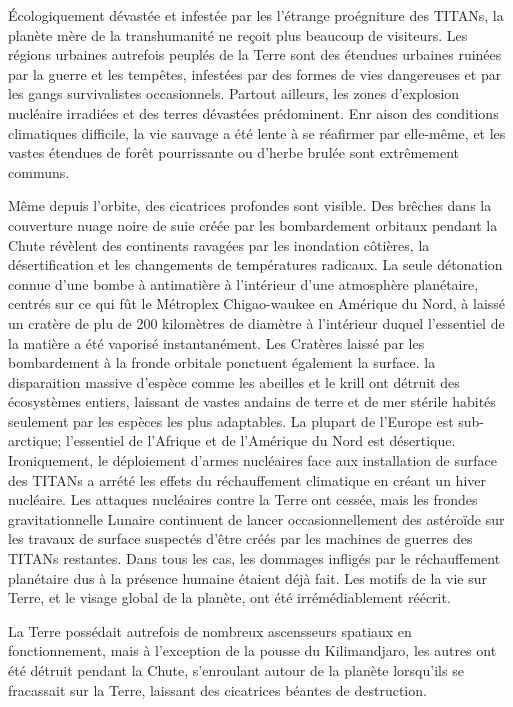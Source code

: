 Écologiquement dévastée et infestée par les l'étrange proégniture des TITANs, la planète mère de la transhumanité ne reçoit plus beaucoup de visiteurs. Les régions urbaines autrefois peuplés de la Terre sont des étendues urbaines ruinées par la guerre et les tempêtes, infestées par des formes de vies dangereuses et par les gangs survivalistes occasionnels. Partout ailleurs, les zones d'explosion nucléaire irradiées et des terres dévastées prédominent. Enr aison des conditions climatiques difficile, la vie sauvage a été lente à se réafirmer par elle-même, et les vastes étendues de forêt pourrissante ou d'herbe brulée sont extrêmement communs. 

Même depuis l'orbite, des cicatrices profondes sont visible. Des brêches dans la couverture nuage noire de suie créée par les bombardement orbitaux pendant la Chute révèlent des continents ravagées par les inondation côtières, la désertification et les changements de températures radicaux. La seule détonation connue d'une bombe à antimatière à l'intérieur d'une atmosphère planétaire, centrés sur ce qui fût le Métroplex Chigao-waukee en Amérique du Nord, à laissé un cratère de plu de 200 kilomètres de diamètre à l'intérieur duquel l'essentiel de la matière a été vaporisé instantanément. Les Cratères laissé par les bombardement à la fronde orbitale ponctuent également la surface. la disparaition massive d'espèce comme les abeilles et le krill ont détruit des écosystèmes entiers, laissant de vastes andains de terre et de mer stérile habités seulement par les espèces les plus adaptables. La plupart de l'Europe est sub-arctique; l'essentiel de l'Afrique et de l'Amérique du Nord est désertique. Ironiquement, le déploiement d'armes nucléaires face aux installation de surface des TITANs a arrété les effets du réchauffement climatique en créant un hiver nucléaire. Les attaques nucléaires contre la Terre ont cessée, mais les frondes gravitationnelle Lunaire continuent de lancer occasionnellement des astéroïde sur les travaux de surface suspectés d'être créés par les machines de guerres des TITANs restantes. Dans tous les cas, les dommages infligés par le réchauffement planétaire dus à la présence humaine étaient déjà fait. Les motifs de la vie sur Terre, et le visage global de la planète, ont été irrémédiablement réécrit. 

La Terre possédait autrefois de nombreux ascensseurs spatiaux en fonctionnement, mais à l'exception de la pousse du Kilimandjaro, les autres ont été détruit pendant la Chute, s'enroulant autour de la planète lorsqu'ils se fracassait sur la Terre, laissant des cicatrices béantes de destruction. 

